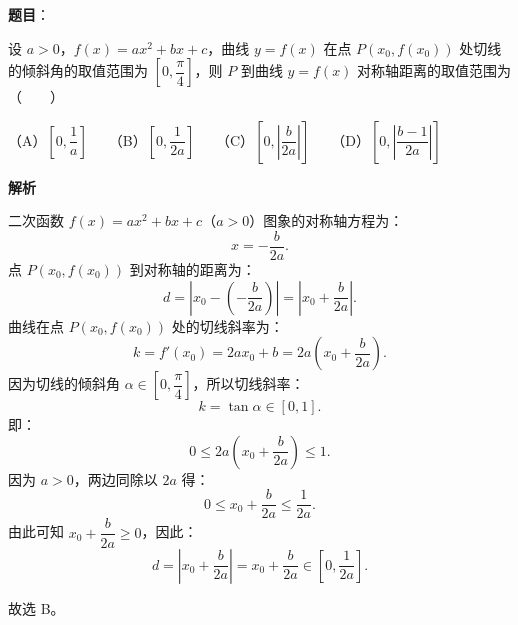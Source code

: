 \begin{answer}

\textbf{题目}：

设 $a > 0$，$f(x) = ax^2 + bx + c$，曲线 $y = f(x)$ 在点 $P(x_0, f(x_0))$ 处切线的倾斜角的取值范围为 $\left[0, \dfrac{\pi}{4}\right]$，则 $P$ 到曲线 $y = f(x)$ 对称轴距离的取值范围为\mbox{（　　）}

（A）$\left[0, \dfrac{1}{a}\right]$　　（B）$\left[0, \dfrac{1}{2a}\right]$　　（C）$\left[0, \left|\dfrac{b}{2a}\right|\right]$　　（D）$\left[0, \left|\dfrac{b-1}{2a}\right|\right]$

\textbf{解析}

二次函数 $f(x) = ax^2 + bx + c$（$a > 0$）图象的对称轴方程为：
\nopagebreak[4]
\[x = -\frac{b}{2a}.\]
点 $P(x_0, f(x_0))$ 到对称轴的距离为：
\nopagebreak[4]
\[d = \left|x_0 - \left(-\frac{b}{2a}\right)\right| = \left|x_0 + \frac{b}{2a}\right|.\]
曲线在点 $P(x_0, f(x_0))$ 处的切线斜率为：
\nopagebreak[4]
\[k = f'(x_0) = 2ax_0 + b = 2a\left(x_0 + \frac{b}{2a}\right).\]
因为切线的倾斜角 $\alpha \in \left[0, \dfrac{\pi}{4}\right]$，所以切线斜率：
\nopagebreak[4]
\[k = \tan\alpha \in [0, 1].\]
即：
\nopagebreak[4]
\[0 \le 2a\left(x_0 + \frac{b}{2a}\right) \le 1.\]
因为 $a > 0$，两边同除以 $2a$ 得：
\nopagebreak[4]
\[0 \le x_0 + \frac{b}{2a} \le \frac{1}{2a}.\]
由此可知 $x_0 + \dfrac{b}{2a} \ge 0$，因此：
\nopagebreak[4]
\[d = \left|x_0 + \frac{b}{2a}\right| = x_0 + \frac{b}{2a} \in \left[0, \frac{1}{2a}\right].\]

故选 B。


\end{answer}
